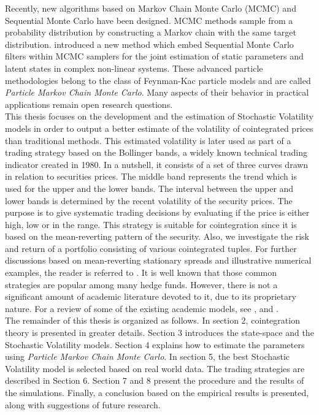 \documentclass[11pt,a4,twosided,singlespacing,titlepagenumber=on]{scrreprt}
\numberwithin{equation}{chapter} %
\theoremstyle{remark}
\begin{document}
Recently, new algorithms based on Markov Chain Monte Carlo (MCMC) and Sequential Monte Carlo have been designed. MCMC methods sample from a probability distribution by constructing a Markov chain with the same target distribution. \cite{andrieu2010} introduced a new method which embed Sequential Monte Carlo filters within MCMC samplers for the joint estimation of static parameters and latent states in complex non-linear systems. These advanced particle methodologies belong to the class of Feynman-Kac particle models and are called \textit{Particle Markov Chain Monte Carlo}. Many aspects of their behavior in practical applications remain open research questions. \\

This thesis focuses on the development and the estimation of Stochastic Volatility models in order to output a better estimate of the volatility of cointegrated prices than traditional methods. This estimated volatility is later used as part of a trading strategy based on the Bollinger bands, a widely known technical trading indicator created in 1980. In a nutshell, it consists of a set of three curves drawn in relation to securities prices. The middle band represents the trend which is used for the upper and the lower bands. The interval between the upper and lower bands is determined by the recent volatility of the security prices. The purpose is to give systematic trading decisions by evaluating if the price is either high, low or in the range. This strategy is suitable for cointegration since it is based on the mean-reverting pattern of the security. Also, we investigate the risk and return of a portfolio consisting of various cointegrated tuples. For further discussions based on mean-reverting stationary spreads and illustrative numerical examples, the reader is referred to \cite{vidyamurthy2004}.  It is well known that those common strategies are popular among many hedge funds. However, there is not a significant amount of academic literature devoted to it, due to its proprietary nature. For a review of some of the existing academic models, see \cite{gatev2006}, \cite{perlin2009} and \cite{broussard2012}. \\

The remainder of this thesis is organized as follows. In section 2, cointegration theory is presented in greater details. Section 3 introduces the state-space and the Stochastic Volatility models. Section 4 explains how to estimate the parameters using \textit{Particle Markov Chain Monte Carlo}. In section 5, the best Stochastic Volatility model is selected based on real world data. The trading strategies are described in Section 6. Section 7 and 8 present the procedure and the results of the simulations. Finally, a conclusion based on the empirical results is presented, along with suggestions of future research.
\end{document}
